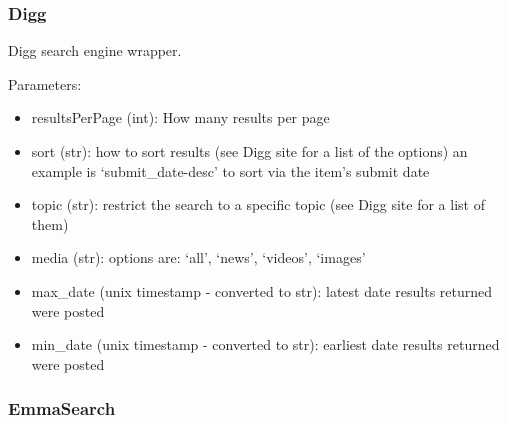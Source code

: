 \documentclass[letterpaper,10pt,english]{sphinxmanual}
\begin{document}
\subsubsection{Digg}
\label{api2.0:digg}

\begin{fulllineitems}
\label{api2.0:puppy.search.engine.Digg}
Digg search engine wrapper.

Parameters:
\begin{itemize}
\item {} 
resultsPerPage (int): How many results per page

\item {} 
sort (str): how to sort results (see Digg site for a list of the options) an example is `submit\_date-desc' to sort via the item's submit date

\item {} 
topic (str): restrict the search to a specific topic (see Digg site for a list of them)

\item {} 
media (str): options are: `all', `news', `videos', `images'

\item {} 
max\_date (unix timestamp - converted to str): latest date results returned were posted

\item {} 
min\_date (unix timestamp - converted to str): earliest date results returned were posted

\end{itemize}

\end{fulllineitems}



\subsubsection{EmmaSearch}
\label{api2.0:emmasearch}
\end{document}
